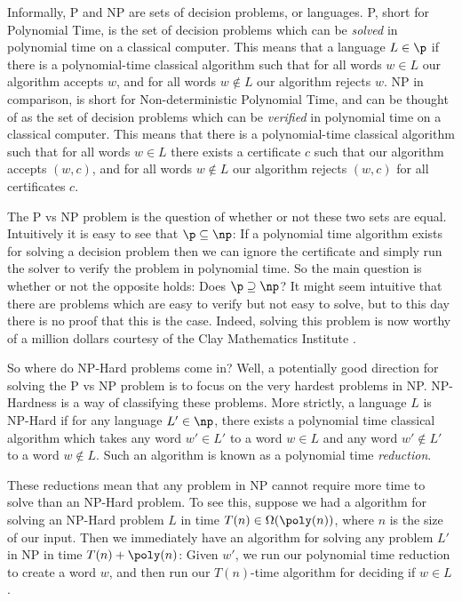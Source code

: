 Informally, P and NP are sets of decision problems, or languages. P, short for Polynomial Time, is the set of decision problems which can be \textit{solved} in polynomial time on a classical computer. This means that a language $L \in \p$ if there is a polynomial-time classical algorithm such that for all words $w \in L$ our algorithm accepts $w$, and for all words $w \notin L$ our algorithm rejects $w$. NP in comparison, is short for Non-deterministic Polynomial Time, and can be thought of as the set of decision problems which can be \textit{verified} in polynomial time on a classical computer. This means that there is a polynomial-time classical algorithm such that for all words $w \in L$ there exists a certificate $c$ such that our algorithm accepts $(w,c)$, and for all words $w \notin L$ our algorithm rejects $(w,c)$ for all certificates $c$.

The P vs NP problem is the question of whether or not these two sets are equal. Intuitively it is easy to see that $\p \subseteq \np$: If a polynomial time algorithm exists for solving a decision problem then we can ignore the certificate and simply run the solver to verify the problem in polynomial time. So the main question is whether or not the opposite holds: Does $\p \supseteq \np$? It might seem intuitive that there are problems which are easy to verify but not easy to solve, but to this day there is no proof that this is the case. Indeed, solving this problem is now worthy of a million dollars courtesy of the Clay Mathematics Institute \cite{cmipvsnp}.

So where do NP-Hard problems come in? Well, a potentially good direction for solving the P vs NP problem is to focus on the very hardest problems in NP. NP-Hardness is a way of classifying these problems. More strictly, a language $L$ is NP-Hard if for any language $L' \in \np$, there exists a polynomial time classical algorithm which takes any word $w'\in L'$ to a word $w \in L$ and any word $w'\notin L'$ to a word $w \notin L$. Such an algorithm is known as a polynomial time \textit{reduction}.

These reductions mean that any problem in NP cannot require more time to solve than an NP-Hard problem. To see this, suppose we had a algorithm for solving an NP-Hard problem $L$ in time $T(n) \in \Omega(\poly(n))$, where $n$ is the size of our input. Then we immediately have an algorithm for solving any problem $L'$ in NP in time $T(n)+\poly(n)$: Given $w'$, we run our polynomial time reduction to create a word $w$, and then run our $T(n)$-time algorithm for deciding if $w \in L$.

